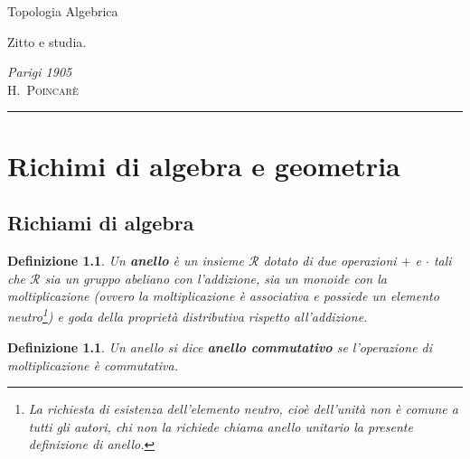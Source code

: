 \documentclass[10pt, twoside=false, x11names]{scrbook}
\newtheorem{definition}[theorem]{Definizione}
\newcommand{\R}{\mathcal{R}}
\begin{document}
\begin{titlepage}

\noindent
\titlefont Topologia Algebrica
\epigraph{Zitto e studia.}%
{\textit{Parigi 1905}\\ \textsc{H.\ Poincarè}}
\null\vfill
\vspace*{1cm}
\noindent
\hfill
\begin{minipage}{0.35\linewidth}
    \begin{flushright}
        \printauthor
    \end{flushright}
\end{minipage}
%
\begin{minipage}{0.02\linewidth}
    \rule{1pt}{125pt}
\end{minipage}
\titlepagedecoration
\end{titlepage}

\tableofcontents
{}
\printsymblist


\chapter{Richimi di algebra e geometria}
\section{Richiami di algebra}

\newmathsymb{R}{\R}{Anello}
\begin{definition}
  Un \textbf{anello}  è un insieme $ \R $ dotato di due operazioni $ + $ e $ \cdot $ tali che
  $ \R $ sia un gruppo abeliano con l'addizione, sia un monoide con la moltiplicazione
  (ovvero la moltiplicazione è associativa e possiede un elemento neutro\footnote{La richiesta
    di esistenza dell'elemento neutro, cioè dell'unità non è comune a tutti gli autori,
    chi non la richiede chiama anello unitario  la presente
    definizione di anello.}) e goda della proprietà distributiva rispetto all'addizione.
\end{definition}

\begin{definition}
  Un anello si dice \textbf{anello commutativo}  se l'operazione di moltiplicazione
  è commutativa.
\end{definition}
\end{document}
